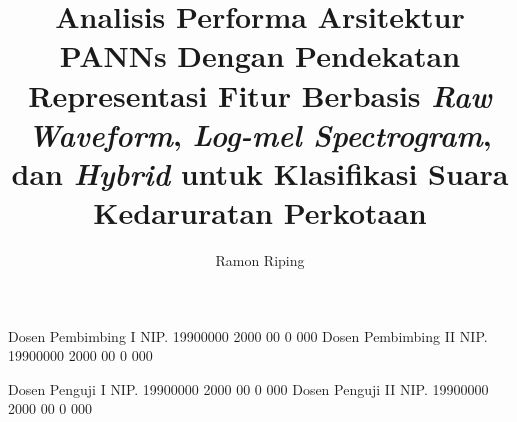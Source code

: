 \documentclass[article]{report} %
\begin{document}
    \setlength{\abovedisplayskip}{2pt plus 1pt minus 9pt}
    \setlength{\belowdisplayskip}{12pt plus 3pt minus 9pt}
    \setlength{\abovedisplayshortskip}{0pt plus 3pt}
    \setlength{\belowdisplayshortskip}{7pt plus 3pt minus 4pt}
    
    \title{Analisis Performa Arsitektur PANN\lowercase{s} Dengan Pendekatan Representasi Fitur Berbasis \textit{Raw Waveform}, \textit{Log-mel Spectrogram}, dan \textit{Hybrid} untuk Klasifikasi Suara Kedaruratan Perkotaan}
    
	\author{Ramon Riping}		%
	
	\dosbingA%
		{Dosen Pembimbing I}%
		{NIP. 19900000 2000 00 0 000}	%
	\dosbingB%
		{Dosen Pembimbing II}%
		{NIP. 19900000 2000 00 0 000}	%
		
	\pengujiA%
		{Dosen Penguji I}%
		{NIP. 19900000 2000 00 0 000}	%
	\pengujiB%
		{Dosen Penguji II}%
		{NIP. 19900000 2000 00 0 000}	%

	\sloppy %
    \setcounter{page}{1} %
\end{document}
